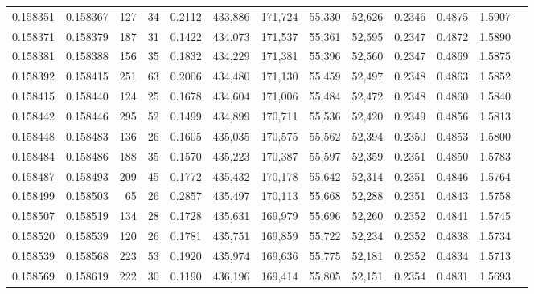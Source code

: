 \begin{tabular}{rrrrrrrrrrrrr}
0.158351 & 0.158367 &   127 &  34 &                                     0.2112 & 433,886 & 171,724 &  55,330 &  52,626 & 0.2346 & 0.4875 & 1.5907 \\
0.158371 & 0.158379 &   187 &  31 &                                     0.1422 & 434,073 & 171,537 &  55,361 &  52,595 & 0.2347 & 0.4872 & 1.5890 \\
0.158381 & 0.158388 &   156 &  35 &                                     0.1832 & 434,229 & 171,381 &  55,396 &  52,560 & 0.2347 & 0.4869 & 1.5875 \\
0.158392 & 0.158415 &   251 &  63 &                                     0.2006 & 434,480 & 171,130 &  55,459 &  52,497 & 0.2348 & 0.4863 & 1.5852 \\
0.158415 & 0.158440 &   124 &  25 &                                     0.1678 & 434,604 & 171,006 &  55,484 &  52,472 & 0.2348 & 0.4860 & 1.5840 \\
0.158442 & 0.158446 &   295 &  52 &                                     0.1499 & 434,899 & 170,711 &  55,536 &  52,420 & 0.2349 & 0.4856 & 1.5813 \\
0.158448 & 0.158483 &   136 &  26 &                                     0.1605 & 435,035 & 170,575 &  55,562 &  52,394 & 0.2350 & 0.4853 & 1.5800 \\
0.158484 & 0.158486 &   188 &  35 &                                     0.1570 & 435,223 & 170,387 &  55,597 &  52,359 & 0.2351 & 0.4850 & 1.5783 \\
0.158487 & 0.158493 &   209 &  45 &                                     0.1772 & 435,432 & 170,178 &  55,642 &  52,314 & 0.2351 & 0.4846 & 1.5764 \\
0.158499 & 0.158503 &    65 &  26 &                                     0.2857 & 435,497 & 170,113 &  55,668 &  52,288 & 0.2351 & 0.4843 & 1.5758 \\
0.158507 & 0.158519 &   134 &  28 &                                     0.1728 & 435,631 & 169,979 &  55,696 &  52,260 & 0.2352 & 0.4841 & 1.5745 \\
0.158520 & 0.158539 &   120 &  26 &                                     0.1781 & 435,751 & 169,859 &  55,722 &  52,234 & 0.2352 & 0.4838 & 1.5734 \\
0.158539 & 0.158568 &   223 &  53 &                                     0.1920 & 435,974 & 169,636 &  55,775 &  52,181 & 0.2352 & 0.4834 & 1.5713 \\
0.158569 & 0.158619 &   222 &  30 &                                     0.1190 & 436,196 & 169,414 &  55,805 &  52,151 & 0.2354 & 0.4831 & 1.5693 \\

\end{tabular}
